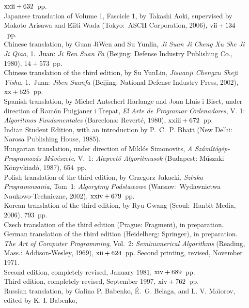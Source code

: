 $\rm xxii+632$~pp. 
\\Japanese translation of Volume 1, Fascicle 1, by Takashi Aoki, supervised
 by Makoto Arisawa and Eiiti Wada (Tokyo:\ ASCII Corporation, 2006), 
 $\rm vii+134$~pp. 
\\Chinese translation, by Guan JiWen and Su Yunlin, {\sl Ji Suan Ji Cheng Xu
 She Ji Ji Qiao}, 1.\ Juan: {\sl Ji Ben Suan Fa\/} (Beijing: Defense Industry
 Publishing Co., 1980), $14+573$~pp.
\\Chinese translation of the third edition, by Su YunLin,
 {\sl Jisuanji Chengxu Sheji Yishu}, 1.\ Juan: {\sl Jiben Suanfa\/}
 (Beijing: National Defense Industry Press, 2002), $\rm xx+625$~pp.
\\Spanish translation, by Michel Antscherl Harlange and
 Joan Lluis i Biset, under direction of Ram\'on Puig\-janer i Trepat,
{\sl El Arte de Programar Ordenadores}, V. 1: {\sl Algoritmos Fundamentales\/}
 (Barcelona: Revert\'e, 1980), $\rm xxiii + 672$~pp.
\\Indian Student Edition, with an introduction by P.~C.~P. Bhatt
 (New Delhi: Narosa Publishing House, 1985).
\\Hungarian translation, under direction of Mikl\'os Simonovits,
 {\sl A Sz\'am\'\i t\'og\'ep-Programoz\'as M\H uv\'eszete}, V.~1:
 {\sl Alapvet\H o Algoritmusok\/}
 (Budapest: M\H uszaki K\"onyvkiad\'o, 1987), 654~pp.
\\Polish translation of the third edition, by Grzegorz Jakacki,
 {\sl Sztuka Programowania}, Tom~1: {\sl Algorytmy Podstawowe\/}
 (Warsaw:\ Wydawnictwa Naukowo-Techniczne, 2002), $\rm xxiv+679$~pp.
\\Korean translation of the third edition, by Ryu Gwang (Seoul:\ Hanbit Media,
 2006), 793~pp.
\\Czech translation of the third edition (Prague: Fragment), in preparation.
\\German translation of the third edition (Heidelberg: Springer),
 in preparation.
\yyskip
\\{\sl The Art of Computer Programming}, Vol.\ 2: {\sl Seminumerical
 Algorithms} (Reading, Mass.: Addison-Wesley, 1969), $\rm xii + 624$~pp.
 Second printing, revised, November 1971.
\\Second edition, completely revised, January 1981, $\rm xiv + 689$~pp.
\\Third edition, completely revised, September 1997, $\rm xiv+762$~pp.
\\Russian translation, by Galina P. Babenko, \'E.~G. Belaga, and L. V.
 Ma\u \i orov, edited by K. I. Babenko, 
